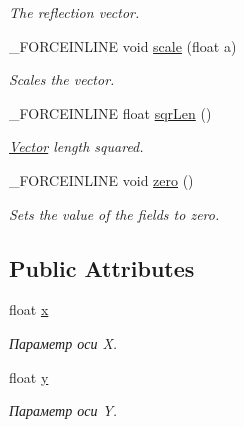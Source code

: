 \begin{DoxyCompactItemize}
\begin{DoxyCompactList}\small\item\em The reflection vector. \end{DoxyCompactList}\item 
\hypertarget{classbt_1_1vector2f_aa0d4cae56cf8aeffe72e95bf35d3f37c}{\-\_\-\-F\-O\-R\-C\-E\-I\-N\-L\-I\-N\-E void \hyperlink{classbt_1_1vector2f_aa0d4cae56cf8aeffe72e95bf35d3f37c}{scale} (float a)}\label{classbt_1_1vector2f_aa0d4cae56cf8aeffe72e95bf35d3f37c}

\begin{DoxyCompactList}\small\item\em Scales the vector. \end{DoxyCompactList}\item 
\hypertarget{classbt_1_1vector2f_a3a43b5bf935609bee690c01a2a7abf81}{\-\_\-\-F\-O\-R\-C\-E\-I\-N\-L\-I\-N\-E float \hyperlink{classbt_1_1vector2f_a3a43b5bf935609bee690c01a2a7abf81}{sqr\-Len} ()}\label{classbt_1_1vector2f_a3a43b5bf935609bee690c01a2a7abf81}

\begin{DoxyCompactList}\small\item\em \hyperlink{classbt_1_1_vector}{Vector} length squared. \end{DoxyCompactList}\item 
\hypertarget{classbt_1_1vector2f_a2659423a36ad53a960e8863f65f8dd33}{\-\_\-\-F\-O\-R\-C\-E\-I\-N\-L\-I\-N\-E void \hyperlink{classbt_1_1vector2f_a2659423a36ad53a960e8863f65f8dd33}{zero} ()}\label{classbt_1_1vector2f_a2659423a36ad53a960e8863f65f8dd33}

\begin{DoxyCompactList}\small\item\em Sets the value of the fields to zero. \end{DoxyCompactList}\end{DoxyCompactItemize}
\subsection*{Public Attributes}
\begin{DoxyCompactItemize}
\item 
\hypertarget{classbt_1_1vector2f_a8ef29451045f6dc4effbae4118da89cf}{float \hyperlink{classbt_1_1vector2f_a8ef29451045f6dc4effbae4118da89cf}{x}}\label{classbt_1_1vector2f_a8ef29451045f6dc4effbae4118da89cf}

\begin{DoxyCompactList}\small\item\em Параметр оси X. \end{DoxyCompactList}\item 
\hypertarget{classbt_1_1vector2f_a03af45be6f95457ea026972a062c3a62}{float \hyperlink{classbt_1_1vector2f_a03af45be6f95457ea026972a062c3a62}{y}}\label{classbt_1_1vector2f_a03af45be6f95457ea026972a062c3a62}

\begin{DoxyCompactList}\small\item\em Параметр оси Y. \end{DoxyCompactList}\end{DoxyCompactItemize}
